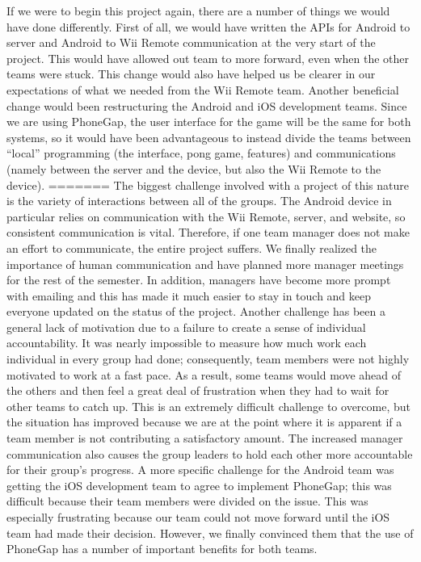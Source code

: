 \documentclass[12pt]{article}
\begin{document}
If we were to begin this project again, there are a number of things we would have done differently.  First of all, we would have written the APIs for Android to server and Android to Wii Remote communication at the very start of the project.  This would have allowed out team to more forward, even when the other teams were stuck.  This change would also have helped us be clearer in our expectations of what we needed from the Wii Remote team.  Another beneficial change would been restructuring the Android and iOS development teams.  Since we are using PhoneGap, the user interface for the game will be the same for both systems, so it would have been advantageous to instead divide the teams between “local” programming (the interface, pong game, features) and communications (namely between the server and the device, but also the Wii Remote to the device). 
=======
The biggest challenge involved with a project of this nature is the variety of interactions between all of the groups.  The Android device in particular relies on communication with the Wii Remote, server, and website, so consistent communication is vital.  Therefore, if one team manager does not make an effort to communicate, the entire project suffers.  We finally realized the importance of human communication and have planned more manager meetings for the rest of the semester.  In addition, managers have become more prompt with emailing and this has made it much easier to stay in touch and keep everyone updated on the status of the project.  Another challenge has been a general lack of motivation due to a failure to create a sense of individual accountability.  It was nearly impossible to measure how much work each individual in every group had done; consequently, team members were not highly motivated to work at a fast pace.  As a result, some teams would move ahead of the others and then feel a great deal of frustration when they had to wait for other teams to catch up.  This is an extremely difficult challenge to overcome, but the situation has improved because we are at the point where it is apparent if a team member is not contributing a satisfactory amount.  The increased manager communication also causes the group leaders to hold each other more accountable for their group’s progress.  A more specific challenge for the Android team was getting the iOS development team to agree to implement PhoneGap; this was difficult because their team members were divided on the issue.  This was especially frustrating because our team could not move forward until the iOS team had made their decision.  However, we finally convinced them that the use of PhoneGap has a number of important benefits for both teams.
\end{document}
